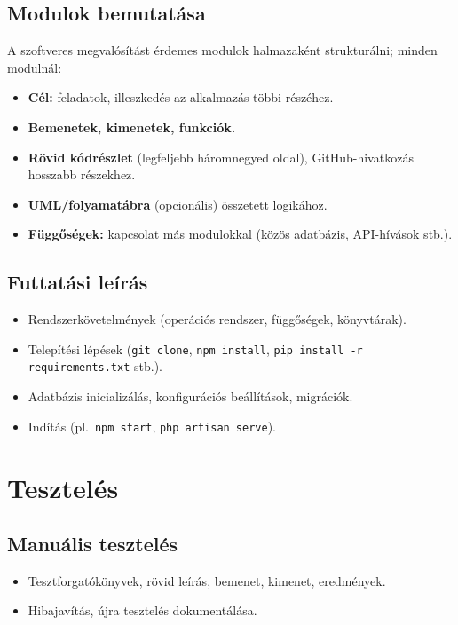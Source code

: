 \documentclass{thesis-ekf}
\begin{document}
\section{Modulok bemutatása}
A szoftveres megvalósítást érdemes modulok halmazaként strukturálni; minden modulnál:
\begin{itemize}
  \item \textbf{Cél:} feladatok, illeszkedés az alkalmazás többi részéhez.
  \item \textbf{Bemenetek, kimenetek, funkciók.}
  \item \textbf{Rövid kódrészlet} (legfeljebb háromnegyed oldal), GitHub-hivatkozás hosszabb részekhez.
  \item \textbf{UML/folyamatábra} (opcionális) összetett logikához.
  \item \textbf{Függőségek:} kapcsolat más modulokkal (közös adatbázis, API-hívások stb.).
\end{itemize}

\section{Futtatási leírás}
\begin{itemize}
  \item Rendszerkövetelmények (operációs rendszer, függőségek, könyvtárak).
  \item Telepítési lépések (\texttt{git clone}, \texttt{npm install}, \texttt{pip install -r requirements.txt} stb.).
  \item Adatbázis inicializálás, konfigurációs beállítások, migrációk.
  \item Indítás (pl.\ \texttt{npm start}, \texttt{php artisan serve}).
\end{itemize}

\chapter{Tesztelés}

\section{Manuális tesztelés}
\begin{itemize}
  \item Tesztforgatókönyvek, rövid leírás, bemenet, kimenet, eredmények.
  \item Hibajavítás, újra tesztelés dokumentálása.
\end{itemize}
\end{document}
